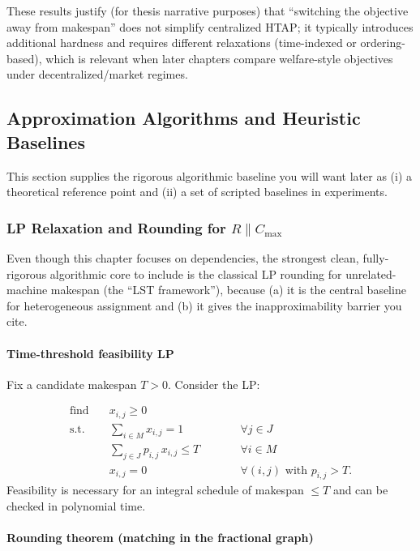 These results justify (for thesis narrative purposes) that ``switching the objective away from makespan'' does not simplify centralized HTAP; it typically introduces additional hardness and requires different relaxations (time-indexed or ordering-based), which is relevant when later chapters compare welfare-style objectives under decentralized/market regimes.

\subsection{Approximation Algorithms and Heuristic Baselines}

This section supplies the rigorous algorithmic baseline you will want later as (i) a theoretical reference point and (ii) a set of scripted baselines in experiments.

\subsubsection{LP Relaxation and Rounding for \(R\parallel C_{\max}\)}

Even though this chapter focuses on dependencies, the strongest clean, fully-rigorous algorithmic core to include is the classical LP rounding for unrelated-machine makespan (the ``LST framework''), because (a) it is the central baseline for heterogeneous assignment and (b) it gives the inapproximability barrier you cite.

\paragraph{Time-threshold feasibility LP}

Fix a candidate makespan \(T>0\). Consider the LP:

\[
\begin{aligned}
\text{find}\quad & x_{i,j}\ge 0 \\
\text{s.t.}\quad
& \sum_{i\in M} x_{i,j} = 1 \qquad &&\forall j\in J \\
& \sum_{j\in J} p_{i,j}\, x_{i,j} \le T \qquad &&\forall i\in M \\
& x_{i,j}=0 \qquad &&\forall (i,j)\text{ with }p_{i,j}>T .
\end{aligned}
\]
Feasibility is necessary for an integral schedule of makespan \(\le T\) and can be checked in polynomial time.

\paragraph{Rounding theorem (matching in the fractional graph)}

